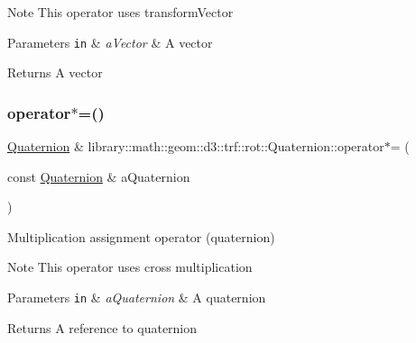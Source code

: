 \begin{DoxyNote}{Note}
This operator uses transform\+Vector
\end{DoxyNote}

\begin{DoxyParams}[1]{Parameters}
\mbox{\tt in}  & {\em a\+Vector} & A vector \\
\hline
\end{DoxyParams}
\begin{DoxyReturn}{Returns}
A vector 
\end{DoxyReturn}
\mbox{\label{classlibrary_1_1math_1_1geom_1_1d3_1_1trf_1_1rot_1_1_quaternion_ae6ac96798a047bdfedf344dfba6abafc}} 
\subsubsection{\texorpdfstring{operator$\ast$=()}{operator*=()}}
{\footnotesize\ttfamily \hyperlink{classlibrary_1_1math_1_1geom_1_1d3_1_1trf_1_1rot_1_1_quaternion}{Quaternion} \& library\+::math\+::geom\+::d3\+::trf\+::rot\+::\+Quaternion\+::operator$\ast$= (\begin{DoxyParamCaption}\item[{const \hyperlink{classlibrary_1_1math_1_1geom_1_1d3_1_1trf_1_1rot_1_1_quaternion}{Quaternion} \&}]{a\+Quaternion }\end{DoxyParamCaption})}



Multiplication assignment operator (quaternion) 

\begin{DoxyNote}{Note}
This operator uses cross multiplication
\end{DoxyNote}

\begin{DoxyParams}[1]{Parameters}
\mbox{\tt in}  & {\em a\+Quaternion} & A quaternion \\
\hline
\end{DoxyParams}
\begin{DoxyReturn}{Returns}
A reference to quaternion 
\end{DoxyReturn}
\mbox{\label{classlibrary_1_1math_1_1geom_1_1d3_1_1trf_1_1rot_1_1_quaternion_af2e72e5232106d28995dbddb1f1c2f16}} 
